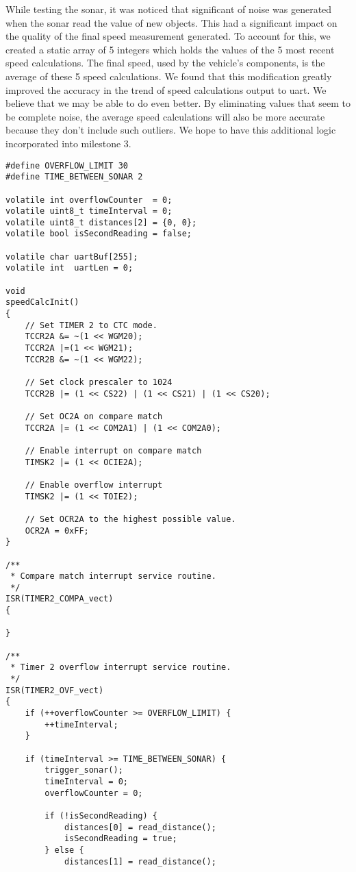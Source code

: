 While testing the sonar, it was noticed that significant of noise was generated when the sonar read the value of new objects. This had a significant impact on the quality of the final speed measurement generated. To account for this, we created a static array of 5 integers which holds the values of the 5 most recent speed calculations. The final speed, used by the vehicle's components, is the average of these 5 speed calculations. We found that this modification greatly improved the accuracy in the trend of speed calculations output to uart. We believe that we may be able to do even better. By eliminating values that seem to be complete noise, the average speed calculations will also be more accurate because they don't include such outliers. We hope to have this additional logic incorporated into milestone 3.

\begin{lstlisting}
#define OVERFLOW_LIMIT 30
#define TIME_BETWEEN_SONAR 2

volatile int overflowCounter  = 0;
volatile uint8_t timeInterval = 0;
volatile uint8_t distances[2] = {0, 0};
volatile bool isSecondReading = false;

volatile char uartBuf[255];
volatile int  uartLen = 0;

void 
speedCalcInit()
{
    // Set TIMER 2 to CTC mode.
    TCCR2A &= ~(1 << WGM20);
    TCCR2A |=(1 << WGM21);
    TCCR2B &= ~(1 << WGM22);

    // Set clock prescaler to 1024
    TCCR2B |= (1 << CS22) | (1 << CS21) | (1 << CS20);

    // Set OC2A on compare match
    TCCR2A |= (1 << COM2A1) | (1 << COM2A0);

    // Enable interrupt on compare match
    TIMSK2 |= (1 << OCIE2A);

    // Enable overflow interrupt
    TIMSK2 |= (1 << TOIE2);

    // Set OCR2A to the highest possible value.
    OCR2A = 0xFF;
}

/**
 * Compare match interrupt service routine.
 */
ISR(TIMER2_COMPA_vect)
{

}

/**
 * Timer 2 overflow interrupt service routine.
 */
ISR(TIMER2_OVF_vect)
{
    if (++overflowCounter >= OVERFLOW_LIMIT) {
        ++timeInterval;
    }

    if (timeInterval >= TIME_BETWEEN_SONAR) {
        trigger_sonar();
        timeInterval = 0;
        overflowCounter = 0;

        if (!isSecondReading) {
            distances[0] = read_distance();
            isSecondReading = true;
        } else {
            distances[1] = read_distance();


\end{lstlisting}
